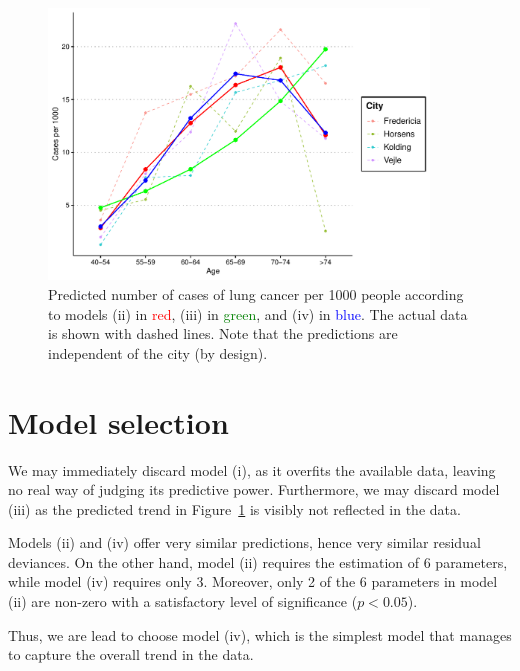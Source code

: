 \documentclass[10pt]{article}
\begin{document}
    \begin{figure}[H]
    \begin{center}
        \vspace{1em}
        \includegraphics[width=0.9\textwidth]{plot_06.pdf}
    \end{center}
    \caption{
        Predicted number of cases of lung cancer per 1000 people according to models
        (ii) in \textcolor{red}{red}, (iii) in \textcolor{green}{green}, and (iv) in
        \textcolor{blue}{blue}. The actual data is shown with dashed lines. Note that
        the predictions are independent of the city (by design).
    }
    \label{fig:danishlc_glm}
    \end{figure}


    \section{Model selection}

    We may immediately discard model (i), as it overfits the available data, leaving
    no real way of judging its predictive power. Furthermore, we may discard model
    (iii) as the predicted trend in Figure~\ref{fig:danishlc_glm} is visibly not
    reflected in the data.

    Models (ii) and (iv) offer very similar predictions, hence very similar residual
    deviances. On the other hand, model (ii) requires the estimation of 6 parameters,
    while model (iv) requires only 3. Moreover, only 2 of the 6 parameters in model
    (ii) are non-zero with a satisfactory level of significance ($p < 0.05$).

    Thus, we are lead to choose model (iv), which is the simplest model that manages
    to capture the overall trend in the data.
\end{document}
